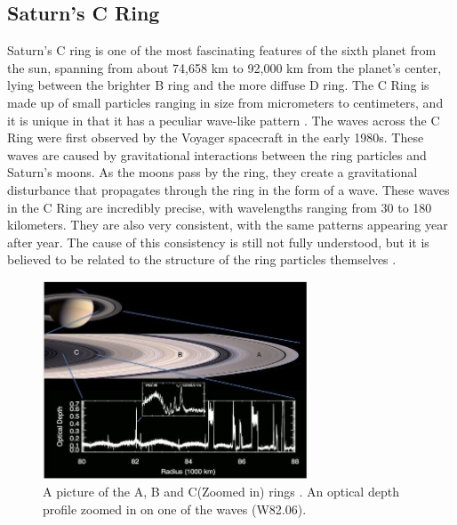 \documentclass{article}
\begin{document}
\subsection{Saturn’s C Ring}
Saturn's C ring is one of the most fascinating features of the sixth planet from the sun, spanning from about 74,658 km to 92,000 km from the planet's center, lying between the brighter B ring and the more diffuse D ring. The C Ring is made up of small particles ranging in size from micrometers to centimeters, and it is unique in that it has a peculiar wave-like pattern \cite{2009sfch.book..375C}\cite{Hedman_2018}\cite{Nicholson1990AnAR}. The waves across the C Ring were first observed by the Voyager spacecraft in the early 1980s. These waves are caused by gravitational interactions between the ring particles and Saturn's moons. As the moons pass by the ring, they create a gravitational disturbance that propagates through the ring in the form of a wave\cite{Hedman_2013}\cite{2014MNRAS.444.1369H}\cite{Hedman_2018}\cite{Marley1993PlanetaryAM}\cite{Nicholson1990AnAR}. These waves in the C Ring are incredibly precise, with wavelengths ranging from 30 to 180 kilometers. They are also very consistent, with the same patterns appearing year after year. The cause of this consistency is still not fully understood, but it is believed to be related to the structure of the ring particles themselves \cite{Hedman_2013}\cite{2014MNRAS.444.1369H}\cite{Hedman_2018}.

\begin{figure}[h] 
\centering
\includegraphics[width=0.7\textwidth]{Ring_Picture_Hedman_2018.jpg}
\caption{A picture of the A, B and C(Zoomed in) rings \cite{Hedman_2018}. An optical depth profile zoomed in on one of the waves (W82.06).} \label{fig:my_label}
\end{figure}
\end{document}
